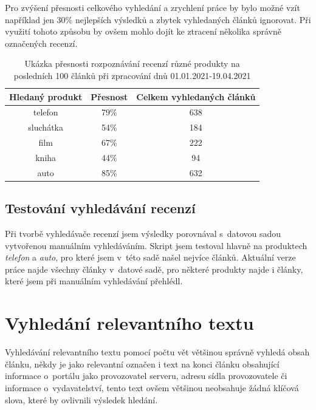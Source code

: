 Pro zvýšení přesnosti celkového vyhledání a zrychlení práce by bylo možné vzít například jen 30\% nejlepších výsledků a zbytek vyhledaných článků ignorovat. Při využití tohoto způsobu by ovšem mohlo dojít ke ztracení několika správně označených recenzí.

\begin{table}[h]
    \centering
    \begin{tabular}{|c|c|c|}
        \hline
        Hledaný produkt & Přesnost & Celkem vyhledaných článků \\
        \hline\hline
        telefon  & 79\% & 638 \\
        \hline
        sluchátka & 54\% & 184 \\
        \hline
        film & 67\% & 222  \\
        \hline
        kniha & 44\% & 94  \\
        \hline
        auto & 85\% & 632  \\
        \hline
    \end{tabular}
    \caption{Ukázka přesnosti rozpoznávání recenzí různé produkty na posledních 100 článků při zpracování dnů 01.01.2021-19.04.2021}
    \label{tab:presnost_na_100_vzorku}
\end{table}



\subsection*{Testování vyhledávání recenzí}

Při tvorbě vyhledávače recenzí jsem výsledky porovnával s~datovou sadou vytvořenou manuálním vyhledáváním. Skript jsem testoval hlavně na produktech \textit{telefon} a \textit{auto}, pro které jsem v~této sadě našel nejvíce článků. Aktuální verze práce najde všechny články v~datové sadě, pro některé produkty najde i články, které jsem při manuálním vyhledávání přehlédl.

\section{Vyhledání relevantního textu}

Vyhledávání relevantního textu pomocí počtu vět většinou správně vyhledá obsah článku, někdy je jako relevantní označen i text na konci článku obsahující informace o~portálu jako provozovatel serveru, adresu sídla provozovatele či informace o~vydavatelství, tento text ovšem většinou neobsahuje žádná klíčová slova, které by ovlivnili výsledek hledání.

